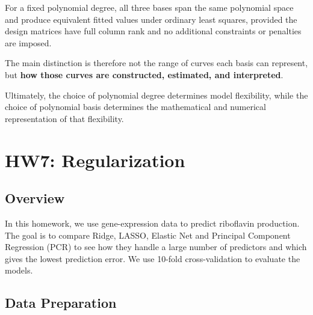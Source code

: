 \documentclass[
  letterpaper,
  DIV=11,
  numbers=noendperiod]{scrreprt}
\newenvironment{Shaded}{\begin{snugshade}}{\end{snugshade}}
\newcommand{\CommentTok}[1]{\textcolor[rgb]{0.37,0.37,0.37}{#1}}
\newcommand{\FunctionTok}[1]{\textcolor[rgb]{0.28,0.35,0.67}{#1}}
\newcommand{\NormalTok}[1]{\textcolor[rgb]{0.00,0.23,0.31}{#1}}
\newcommand{\OtherTok}[1]{\textcolor[rgb]{0.00,0.23,0.31}{#1}}
\newcommand{\SpecialCharTok}[1]{\textcolor[rgb]{0.37,0.37,0.37}{#1}}
\newcommand{\StringTok}[1]{\textcolor[rgb]{0.13,0.47,0.30}{#1}}
\begin{document}
For a fixed polynomial degree, all three bases span the same polynomial
space and produce equivalent fitted values under ordinary least squares,
provided the design matrices have full column rank and no additional
constraints or penalties are imposed.

The main distinction is therefore not the range of curves each basis can
represent, but \textbf{how those curves are constructed, estimated, and
interpreted}.

Ultimately, the choice of polynomial degree determines model
flexibility, while the choice of polynomial basis determines the
mathematical and numerical representation of that flexibility.


\chapter{HW7: Regularization}\label{hw7-regularization}

\section{Overview}\label{overview}

In this homework, we use gene-expression data to predict riboflavin
production. The goal is to compare Ridge, LASSO, Elastic Net and
Principal Component Regression (PCR) to see how they handle a large
number of predictors and which gives the lowest prediction error. We use
10-fold cross-validation to evaluate the models.

\section{Data Preparation}\label{data-preparation}

\begin{Shaded}
\end{Shaded}
\end{document}

